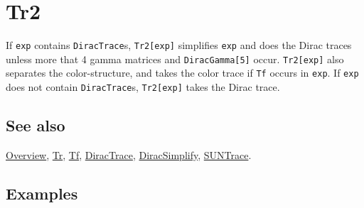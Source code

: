 \documentclass[../FeynCalcManual.tex]{subfiles}
\begin{document}
\hypertarget{tr2}{%
\section{Tr2}\label{tr2}}

If \texttt{exp} contains \texttt{DiracTrace}s,
\texttt{Tr2[\allowbreak{}exp]} simplifies \texttt{exp} and does the
Dirac traces unless more that 4 gamma matrices and
\texttt{DiracGamma[\allowbreak{}5]} occur.
\texttt{Tr2[\allowbreak{}exp]} also separates the color-structure, and
takes the color trace if \texttt{Tf} occurs in \texttt{exp}. If
\texttt{exp} does not contain \texttt{DiracTrace}s,
\texttt{Tr2[\allowbreak{}exp]} takes the Dirac trace.

\subsection{See also}

\hyperlink{toc}{Overview}, \hyperlink{tr}{Tr}, \hyperlink{tf}{Tf},
\hyperlink{diractrace}{DiracTrace},
\hyperlink{diracsimplify}{DiracSimplify},
\hyperlink{suntrace}{SUNTrace}.

\subsection{Examples}
\end{document}
